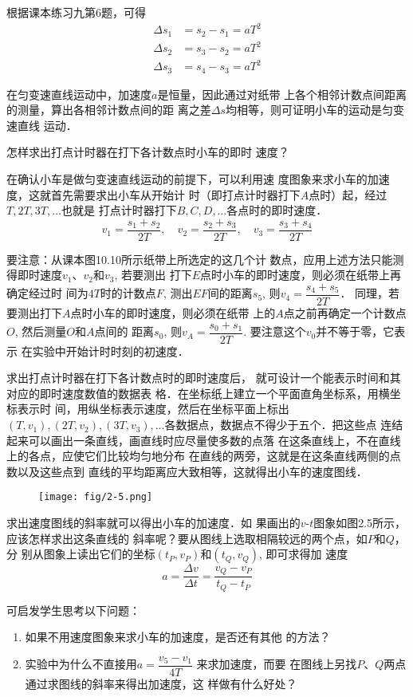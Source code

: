 根据课本练习九第6题，可得
\[\begin{split}
    \Delta s_1&=s_2-s_1=aT^2\\
    \Delta s_2&=s_3-s_2=aT^2\\
    \Delta s_3&=s_4-s_3=aT^2
\end{split}\]

在匀变速直线运动中，加速度$a$是恒量，因此通过对纸带
上各个相邻计数点间距离的测量，算出各相邻计数点间的距
离之差$\Delta s$均相等，则可证明小车的运动是匀变速直线
运动．

怎样求出打点计时器在打下各计数点时小车的即时
速度？

在确认小车是做匀变速直线运动的前提下，可以利用速
度图象来求小车的加速度，这就首先需要求出小车从开始计
时（即打点计时器打下$A$点时）起，经过$T,2T,3T,\ldots$也就是
打点计时器打下$B,C,D,\ldots$各点时的即时速度．
\[v_1=\frac{s_1+s_2}{2T},\quad v_2=\frac{s_2+s_3}{2T},\quad v_3=\frac{s_3+s_4}{2T}\]

要注意：从课本图10.10所示纸带上所选定的这几个计
数点，应用上述方法只能测得即时速度$v_1$、$v_2$和$v_3$, 若要测出
打下$E$点时小车的即时速度，则必须在纸带上再确定经过时
间为$4T$时的计数点$F$, 测出$EF$间的距离$s_5$, 则$v_4=\dfrac{s_4+s_5}{2T}$．
同理，若要测出打下$A$点时小车的即时速度，则必须在纸带
上的$A$点之前再确定一个计数点$O$, 然后测量$O$和$A$点间的
距离$s_0$, 则$v_A=\dfrac{s_0+s_1}{2T}$.
要注意这个$v_0$并不等于零，它表示
在实验中开始计时时刻的初速度．

求出打点计时器在打下各计数点时的即时速度后，
就可设计一个能表示时间和其对应的即时速度数值的数据表
格．在坐标纸上建立一个平面直角坐标系，用横坐标表示时
间，用纵坐标表示速度，然后在坐标平面上标出$(T,v_1),(2T,
v_2),(3T,v_3),\ldots$各数据点，数据点不得少于五个．把这些点
连结起来可以画出一条直线，画直线时应尽量使多数的点落
在这条直线上，不在直线上的各点，应使它们比较均匀地分布
在直线的两旁，这就是在这条直线两侧的点数以及这些点到
直线的平均距离应大致相等，这就得出小车的速度图线．

\begin{figure}[htp]
    \centering
    \texttt{[image: fig/2-5.png]}
    \caption{}
\end{figure}

求出速度图线的斜率就可以得出小车的加速度．如
果画出的$v$-$t$图象如图2.5所示，应该怎样求出这条直线的
斜率呢？要从图线上选取相隔较远的两个点，如$P$和$Q$，分
别从图象上读出它们的坐标$(t_P,v_P)$和$(t_Q,v_Q)$, 即可求得加
速度
\[a=\frac{\Delta v}{\Delta t}=\frac{v_Q-v_P}{t_Q-t_P}\]

可启发学生思考以下问题：
\begin{enumerate}
    \item 如果不用速度图象来求小车的加速度，是否还有其他
的方法？
\item 实验中为什么不直接用$a=\dfrac{v_5-v_1}{4T}$
来求加速度，而要
在图线上另找$P$、$Q$两点通过求图线的斜率来得出加速度，这
样做有什么好处？
\end{enumerate}

